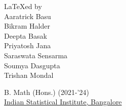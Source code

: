\documentclass[../Analysis-3.tex]{subfiles}
\begin{document}

\newpage
\thispagestyle{plain}

\phantom{.}

\vfill

\sffamily
{\LARGE {\rm\LaTeX}ed by} \\[0.5cm]

\large
Aaratrick Basu \\
Bikram Halder \\
Deepta Basak \\
Priyatosh Jana \\
Saraswata Sensarma \\
Soumya Dasgupta \\
Trishan Mondal

\vspace{0.5cm}

B. Math (Hons.) (2021-'24) \\
\href{https://www.isibang.ac.in}{Indian Statistical Institute, Bangalore}
\end{document}
